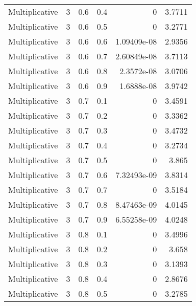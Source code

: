 \documentclass{article}
\begin{document}
\begin{longtable}[H]{lrrrrr}
 Multiplicative &       3 &   0.6 &            0.4 &      0           &          3.7711 \\
 Multiplicative &       3 &   0.6 &            0.5 &      0           &          3.2771 \\
 Multiplicative &       3 &   0.6 &            0.6 &      1.09409e-08 &          2.9356 \\
 Multiplicative &       3 &   0.6 &            0.7 &      2.60849e-08 &          3.7113 \\
 Multiplicative &       3 &   0.6 &            0.8 &      2.3572e-08  &          3.0706 \\
 Multiplicative &       3 &   0.6 &            0.9 &      1.6888e-08  &          3.9742 \\
 Multiplicative &       3 &   0.7 &            0.1 &      0           &          3.4591 \\
 Multiplicative &       3 &   0.7 &            0.2 &      0           &          3.3362 \\
 Multiplicative &       3 &   0.7 &            0.3 &      0           &          3.4732 \\
 Multiplicative &       3 &   0.7 &            0.4 &      0           &          3.2734 \\
 Multiplicative &       3 &   0.7 &            0.5 &      0           &          3.865  \\
 Multiplicative &       3 &   0.7 &            0.6 &      7.32493e-09 &          3.8314 \\
 Multiplicative &       3 &   0.7 &            0.7 &      0           &          3.5184 \\
 Multiplicative &       3 &   0.7 &            0.8 &      8.47463e-09 &          4.0145 \\
 Multiplicative &       3 &   0.7 &            0.9 &      6.55258e-09 &          4.0248 \\
 Multiplicative &       3 &   0.8 &            0.1 &      0           &          3.4996 \\
 Multiplicative &       3 &   0.8 &            0.2 &      0           &          3.658  \\
 Multiplicative &       3 &   0.8 &            0.3 &      0           &          3.1393 \\
 Multiplicative &       3 &   0.8 &            0.4 &      0           &          2.8676 \\
 Multiplicative &       3 &   0.8 &            0.5 &      0           &          3.2785 \\

\end{longtable}
\end{document}
